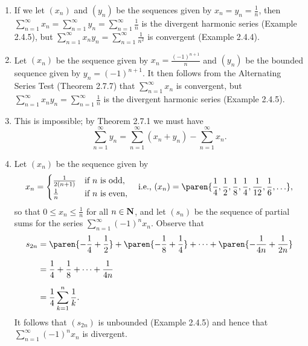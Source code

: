 \documentclass{lew98_solutions}
\begin{document}
\begin{solution}
    \begin{enumerate}
        \item If we let \( (x_n) \) and \( (y_n) \) be the sequences given by \( x_n = y_n = \tfrac{1}{n} \), then \( \sum_{n=1}^{\infty} x_n = \sum_{n=1}^{\infty} y_n = \sum_{n=1}^{\infty} \tfrac{1}{n} \) is the divergent harmonic series (Example 2.4.5), but \( \sum_{n=1}^{\infty} x_n y_n = \sum_{n=1}^{\infty} \tfrac{1}{n^2} \) is convergent (Example 2.4.4).

        \item Let \( (x_n) \) be the sequence given by \( x_n = \tfrac{(-1)^{n+1}}{n} \) and \( (y_n) \) be the bounded sequence given by \( y_n = (-1)^{n+1} \). It then follows from the Alternating Series Test (Theorem 2.7.7) that \( \sum_{n=1}^{\infty} x_n \) is convergent, but \( \sum_{n=1}^{\infty} x_n y_n = \sum_{n=1}^{\infty} \tfrac{1}{n} \) is the divergent harmonic series (Example 2.4.5).

        \item This is impossible; by Theorem 2.7.1 we must have
        \[
            \sum_{n=1}^{\infty} y_n = \sum_{n=1}^{\infty} (x_n + y_n) - \sum_{n=1}^{\infty} x_n.
        \]

        \item Let \( (x_n) \) be the sequence given by
        \[
            x_n = \begin{cases}
                \frac{1}{2(n+1)} & \text{if } n \text{ is odd}, \\
                \frac{1}{n} & \text{if } n \text{ is even},
            \end{cases}
            \quad \text{i.e., } (x_n) = \paren{ \frac{1}{4}, \frac{1}{2}, \frac{1}{8}, \frac{1}{4}, \frac{1}{12}, \frac{1}{6}, \ldots },
        \]
        so that \( 0 \leq x_n \leq \tfrac{1}{n} \) for all \( n \in \mathbf{N} \), and let \( (s_n) \) be the sequence of partial sums for the series \( \sum_{n=1}^{\infty} (-1)^n x_n \). Observe that
        \begin{align*}
            s_{2n} &= \paren{ -\frac{1}{4} + \frac{1}{2} } + \paren{ -\frac{1}{8} + \frac{1}{4} } + \cdots + \paren{ -\frac{1}{4n} + \frac{1}{2n} } \\[2mm]
            &= \frac{1}{4} + \frac{1}{8} + \cdots + \frac{1}{4n} \\[2mm]
            &= \frac{1}{4} \sum_{k=1}^n \frac{1}{k}.
        \end{align*}
        It follows that \( (s_{2n}) \) is unbounded (Example 2.4.5) and hence that \( \sum_{n=1}^{\infty} (-1)^n x_n \) is divergent.
    \end{enumerate}
\end{solution}
\end{document}
